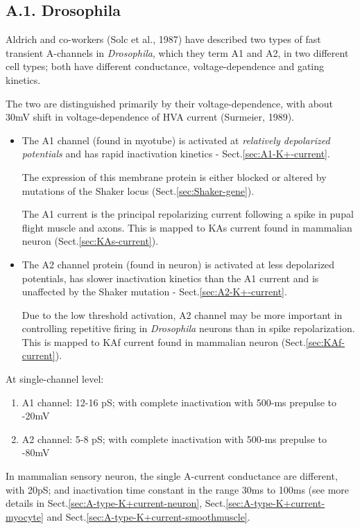 \subsection{A.1. Drosophila}
\label{sec:A-type-K+current-Drosophila}

Aldrich and co-workers (Solc et al., 1987) have described two types of fast
transient A-channels in {\it Drosophila}, which they term A1 and A2, in two
different cell types; both have different conductance, voltage-dependence and gating kinetics.

The two are distinguished primarily by their voltage-dependence, with about 30mV
shift in voltage-dependence of HVA current (Surmeier, 1989).
\begin{itemize}
  \item  The A1 channel (found in myotube) is activated at {\it relatively
  depolarized potentials} and has rapid inactivation kinetics -
  Sect.\ref{sec:A1-K+-current}.

The expression of this membrane protein is either blocked or altered by
mutations of the Shaker locus (Sect.\ref{sec:Shaker-gene}). 

The A1 current is the principal repolarizing current following a spike in pupal
flight muscle and axons. This is mapped to KAs current found in mammalian neuron
(Sect.\ref{sec:KAs-current}).
  
  \item The A2 channel protein (found in neuron) is activated at less
  depolarized potentials, has slower inactivation kinetics than the A1 current
  and is unaffected by the Shaker mutation - Sect.\ref{sec:A2-K+-current}.
  
  Due to the low threshold activation, A2 channel may be more important in
  controlling repetitive firing in {\it Drosophila} neurons than in spike
  repolarization. This is mapped to KAf current found in mammalian neuron
(Sect.\ref{sec:KAf-current}).
\end{itemize}

At single-channel level:
\begin{enumerate}
  \item A1 channel: 12-16 pS; with complete inactivation with 500-ms prepulse to
  -20mV
  
  \item A2 channel: 5-8 pS; with complete inactivation with 500-ms prepulse to
  -80mV
\end{enumerate}
In mammalian sensory neuron, the single A-current conductance are different,
with 20pS; and inactivation time constant in the range 30ms to 100ms (see more
details in Sect.\ref{sec:A-type-K+current-neuron},
Sect.\ref{sec:A-type-K+current-myocyte} and
Sect.\ref{sec:A-type-K+current-smoothmuscle}.


